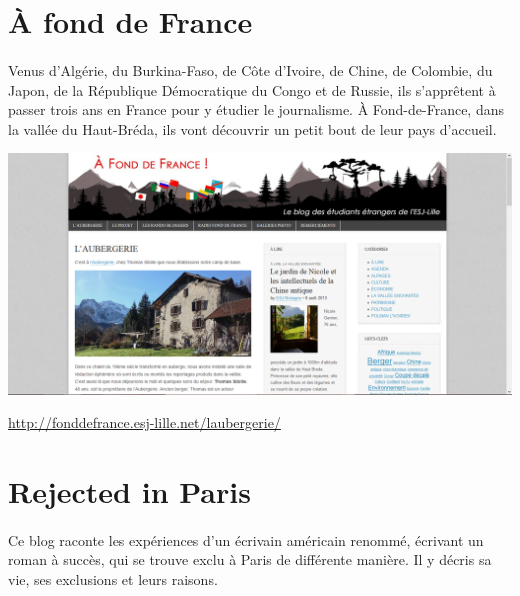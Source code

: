 \section{À fond de France}

\paragraph{} Venus d'Algérie, du Burkina-Faso, de Côte d'Ivoire, de Chine, de
Colombie, du Japon, de la République Démocratique du Congo et de Russie, ils
s'apprêtent à passer trois ans en France pour y étudier le journalisme. À
Fond-de-France, dans la vallée du Haut-Bréda, ils vont découvrir un petit bout
de leur pays d'accueil.

\begin{center}
	\includegraphics[scale=0.25]{AFondDeFrance.png}
\end{center}
\url{http://fonddefrance.esj-lille.net/laubergerie/}

\section{Rejected in Paris}

\paragraph{} Ce blog raconte les expériences d'un écrivain américain renommé,
écrivant un roman à succès, qui se trouve exclu à Paris de différente manière.
Il y décris sa vie, ses exclusions et leurs raisons.

